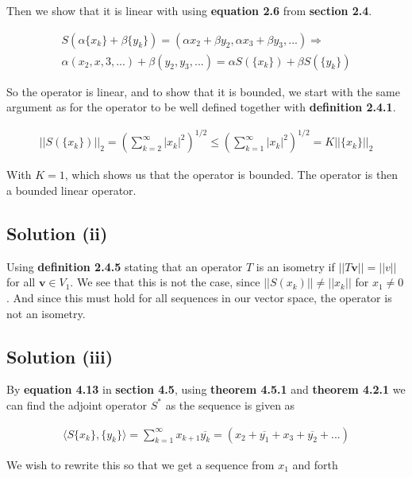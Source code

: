 \documentclass{article}
\begin{document}
Then we show that it is linear with using \textbf{equation 2.6} from \textbf{section 2.4}.

\begin{gather*}
    S( \alpha \{x_k\} + \beta \{y_k\}) = (\alpha x_2 + \beta y_2, \alpha x_3 + \beta y_3, ... )  \Rightarrow \\
     \alpha ( x_2, x,3,...) + \beta(y_2,y_3,...) = \alpha S(\{x_k\}) + \beta S(\{y_k\}) 
\end{gather*}

So the operator is linear, and to show that it is bounded, we start with the same argument as for the operator to be well defined together with \textbf{definition 2.4.1}.

\begin{gather*}
 || S(\{x_k\}) ||_2 = \left(\sum_{k=2}^\infty |x_k|^2 \right)^{1/2} \leq \left(\sum_{k=1}^\infty |x_k|^2 \right)^{1/2} = K ||\{x_k\}||_2 
 \end{gather*}
 
 With $K = 1$, which shows us that the operator is bounded.
 The operator is then a bounded linear operator. 
 
 \subsection*{Solution (ii)}
 
 Using \textbf{definition 2.4.5} stating that an operator $T$ is an isometry if $||T\mathbf{v}|| = ||v||$ for all $\mathbf{v} \in V_1$. We see that this is not the case, since $||S({x_k})||  \neq ||{x_k}||$ for $x_1 \neq 0$. And since this must hold for all sequences in our vector space, the operator is not an isometry. 

\subsection*{Solution (iii)}

By \textbf{equation 4.13} in \textbf{section 4.5}, using \textbf{theorem 4.5.1} and \textbf{theorem 4.2.1} we can find the adjoint operator $S^\ast$ as the sequence is given as

\begin{gather*}
    \langle S \{x_k\} , \{y_k\} \rangle = \sum_{k=1}^\infty x_{k+1}  \overline{y_k} =(x_2+\overline{y_1}+x_3+\overline{y_2}+...)
\end{gather*}

We wish to rewrite this so that we get a sequence from $x_1$ and forth
\end{document}
